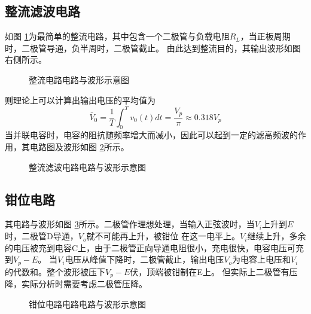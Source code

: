 \documentclass[a4paper,11pt,UTF8]{ctexart}
\begin{document}
	\subsection{整流滤波电路}
	如图 \ref{fig:SVCsim}为最简单的整流电路，其中包含一个二极管与负载电阻$R_L$，当正板周期时，二极管导通，负半周时，二极管截止。
	由此达到整流目的，其输出波形如图右侧所示。
	\begin{figure}[htbp]
		\centering
		\caption{整流电路电路与波形示意图}
		\label{fig:SVCsim}
	\end{figure}
	则理论上可以计算出输出电压的平均值为
	\begin{equation}
		\bar{V}_0=\frac{1}{T}\int_0^Tv_0(t)dt=\frac{V_p}{\pi}\approx0.318V_p
		\label{eqa:avgV_SVC}
	\end{equation}
	当并联电容时，电容的阻抗随频率增大而减小，因此可以起到一定的滤高频波的作用，其电路图及波形如图 \ref{fig:SVCcom}所示。
	\begin{figure}[htbp]
		\centering
		\caption{整流滤波电路电路与波形示意图}
		\label{fig:SVCcom}
	\end{figure}
	
	\subsection{钳位电路}
	其电路与波形如图 \ref{fig:clamper}所示。二极管作理想处理，当输入正弦波时，当$V_i$上升到$E$时，二极管D导通，$V_o$就不可能再上升，被钳位
	在这一电平上。$V_i$继续上升，多余的电压被充到电容C上，由于二极管正向导通电阻很小，充电很快，电容电压可充到$V_p-E$。
	当$V_i$电压从峰值下降时，二极管截止，输出电压$V_o$为电容上电压和$V_i$的代数和。整个波形被压下$V_p-E$伏，顶端被钳制在E上。
	但实际上二极管有压降，实际分析时需要考虑二极管压降。
	\begin{figure}[htbp]
		\centering
		\caption{钳位电路电路电路与波形示意图}
		\label{fig:clamper}
	\end{figure}
	
\end{document}
